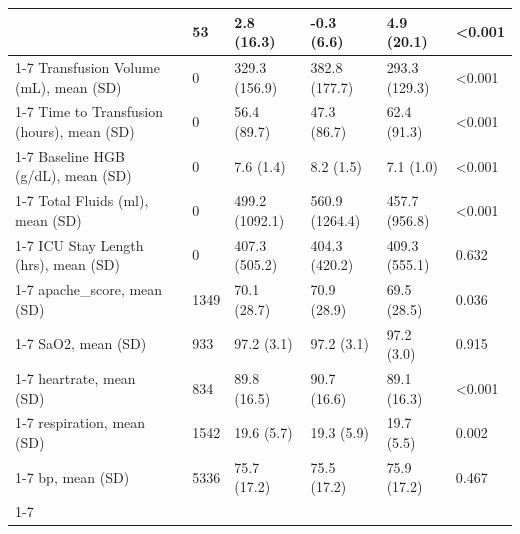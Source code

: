 \begin{tabular}{lllllll}
{{{{{\cline{1-7}
treatment_effect_per_unit, mean (SD) &  & 53 & 2.8 (16.3) & -0.3 (6.6) & 4.9 (20.1) & <0.001 \\
\cline{1-7}
Transfusion Volume (mL), mean (SD) &  & 0 & 329.3 (156.9) & 382.8 (177.7) & 293.3 (129.3) & <0.001 \\
\cline{1-7}
Time to Transfusion (hours), mean (SD) &  & 0 & 56.4 (89.7) & 47.3 (86.7) & 62.4 (91.3) & <0.001 \\
\cline{1-7}
Baseline HGB (g/dL), mean (SD) &  & 0 & 7.6 (1.4) & 8.2 (1.5) & 7.1 (1.0) & <0.001 \\
\cline{1-7}
Total Fluids (ml), mean (SD) &  & 0 & 499.2 (1092.1) & 560.9 (1264.4) & 457.7 (956.8) & <0.001 \\
\cline{1-7}
ICU Stay Length (hrs), mean (SD) &  & 0 & 407.3 (505.2) & 404.3 (420.2) & 409.3 (555.1) & 0.632 \\
\cline{1-7}
apache_score, mean (SD) &  & 1349 & 70.1 (28.7) & 70.9 (28.9) & 69.5 (28.5) & 0.036 \\
\cline{1-7}
SaO2, mean (SD) &  & 933 & 97.2 (3.1) & 97.2 (3.1) & 97.2 (3.0) & 0.915 \\
\cline{1-7}
heartrate, mean (SD) &  & 834 & 89.8 (16.5) & 90.7 (16.6) & 89.1 (16.3) & <0.001 \\
\cline{1-7}
respiration, mean (SD) &  & 1542 & 19.6 (5.7) & 19.3 (5.9) & 19.7 (5.5) & 0.002 \\
\cline{1-7}
bp, mean (SD) &  & 5336 & 75.7 (17.2) & 75.5 (17.2) & 75.9 (17.2) & 0.467 \\
\cline{1-7}
\bottomrule
\end{tabular}
